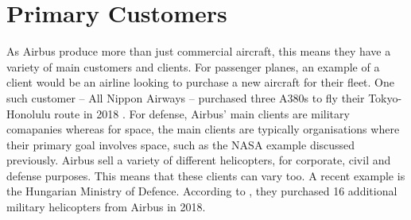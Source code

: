 \section{Primary Customers}
As Airbus produce more than just commercial aircraft, this means they have a variety of main customers and clients. For passenger planes, an example of a client would be an airline looking to purchase a new aircraft for their fleet. One such customer -- All Nippon Airways -- purchased three A380s to fly their Tokyo-Honolulu route in 2018 \parencite{ana2018}.
For defense, Airbus' main clients are military comapanies whereas for space, the main clients are typically organisations where their primary goal involves space, such as the NASA example discussed previously. Airbus sell a variety of different helicopters, for corporate, civil and defense purposes. This means that these clients can vary too. A recent example is the Hungarian Ministry of Defence. According to \cite{budapest2018}, they purchased 16 additional military helicopters from Airbus in 2018.
